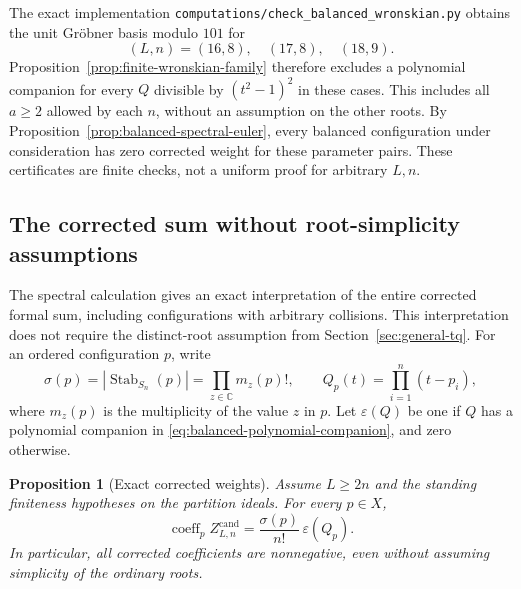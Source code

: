 \documentclass[11pt]{article}
\newtheorem{proposition}{Proposition}[section]
\theoremstyle{definition}
\newcommand{\C}{\mathbb C}
\begin{document}
The exact implementation
\texttt{computations/check\_balanced\_wronskian.py} obtains the unit
Gr\"obner basis modulo $101$ for
\[
 (L,n)=(16,8),\quad(17,8),\quad(18,9).
\]
Proposition~\ref{prop:finite-wronskian-family} therefore excludes a
polynomial companion for every $Q$ divisible by $(t^2-1)^2$ in
these cases. This includes all $a\ge2$ allowed by each $n$, without
an assumption on the other roots. By
Proposition~\ref{prop:balanced-spectral-euler}, every balanced
configuration under consideration has zero corrected weight for
these parameter pairs. These certificates are finite checks, not a
uniform proof for arbitrary $L,n$.

\subsection{The corrected sum without root-simplicity assumptions}

The spectral calculation gives an exact interpretation of the entire
corrected formal sum, including configurations with arbitrary
collisions. This interpretation does not require the distinct-root
assumption from Section~\ref{sec:general-tq}.
For an ordered configuration $p$, write
\[
 \sigma(p)=|\operatorname{Stab}_{S_n}(p)|
          =\prod_{z\in\C}m_z(p)!,\qquad
 Q_p(t)=\prod_{i=1}^n(t-p_i),
\]
where $m_z(p)$ is the multiplicity of the value $z$ in $p$.
Let $\varepsilon(Q)$ be one if $Q$ has a polynomial companion in
\eqref{eq:balanced-polynomial-companion}, and zero otherwise.

\begin{proposition}[Exact corrected weights]
\label{prop:exact-corrected-weights}
Assume $L\ge2n$ and the standing finiteness hypotheses on the
partition ideals. For every $p\in X$,
\begin{equation}\label{eq:exact-corrected-weight}
 \boxed{\operatorname{coeff}_p Z^{\mathrm{cand}}_{L,n}
       =\frac{\sigma(p)}{n!}\,\varepsilon(Q_p).}
\end{equation}
In particular, all corrected coefficients are nonnegative, even
without assuming simplicity of the ordinary roots.
\end{proposition}
\end{document}
